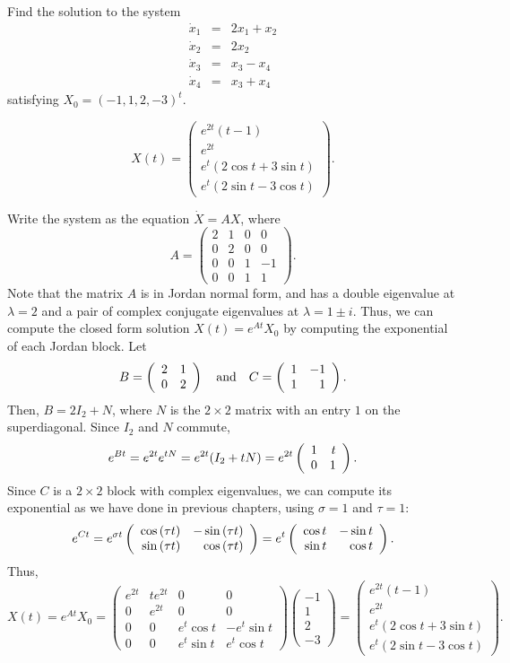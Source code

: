 \documentclass{ximera}
\begin{document}
\begin{exercise} \label{c11.1.1}
Find the solution to the system
\begin{eqnarray*}
\dot{x}_1 & = & 2x_1+x_2 \\
\dot{x}_2 & = & 2x_2 \\
\dot{x}_3 & = & x_3-x_4 \\
\dot{x}_4 & = & x_3+x_4
\end{eqnarray*}
satisfying $X_0=(-1,1,2,-3)^t$.

\begin{solution}
\ans 
\[
X(t) =
\left(\begin{array}{c}
e^{2t}(t - 1) \\
e^{2t} \\
e^t(2\cos{t} + 3\sin{t}) \\
e^t(2\sin{t} - 3\cos{t})
\end{array}\right).
\]

\soln Write the system as the equation $\dot{X} = AX$, where
\[
A =
\left(\begin{array}{rrrr}
2 & 1 & 0 & 0 \\
0 & 2 & 0 & 0 \\
0 & 0 & 1 & -1 \\
0 & 0 & 1 & 1
\end{array}\right).
\]
Note that the matrix $A$ is in Jordan normal form, and has a double
eigenvalue at $\lambda = 2$ and a pair of complex conjugate eigenvalues
at $\lambda = 1 \pm i$.  Thus, we can compute the closed form solution
$X(t) = e^{At}X_0$ by computing the exponential of each Jordan block.  Let
\[
B = \left(\begin{array}{rr} 2 & 1\\ 0 &2\end{array}\right) \quad\mbox{and}\quad C = \left(\begin{array}{rr} 1 & -1\\ 1 &1\end{array}\right).
\]
Then, $B = 2I_2 + N$, where $N$ is the $2 \times 2$ matrix with an entry $1$
on the superdiagonal.  Since $I_2$ and $N$ commute,
\[
e^{Bt} = e^{2t}e^{tN} = e^{2t}(I_2 + tN) =
e^{2t}\left(\begin{array}{rr} 1 & t\\ 0 &1\end{array}\right).
\]
Since $C$ is a $2 \times 2$ block with complex eigenvalues, we can
compute its exponential as we have done in previous chapters, using
$\sigma = 1$ and $\tau = 1$:
\[
e^{Ct} = e^{\sigma t}\left(\begin{array}{rr} \cos{(\tau t)} & -\sin{(\tau t)}\\ \sin{(\tau t)} &\cos{(\tau t)}\end{array}\right)
= e^{t}\left(\begin{array}{rr} \cos{t} & -\sin{t}\\ \sin{t} &\cos{t}\end{array}\right).
\]
Thus,
\[
X(t) = e^{At}X_0 =
\left(\begin{array}{cccc}
e^{2t} & te^{2t} & 0 & 0 \\
0 & e^{2t} & 0 & 0 \\
0 & 0 & e^t\cos{t} & -e^t\sin{t} \\
0 & 0 & e^t\sin{t} & e^t\cos{t}
\end{array}\right)
\left(\begin{array}{r} -1 \\ 1 \\ 2 \\ -3 \end{array}\right)
= \left(\begin{array}{c}
e^{2t}(t - 1) \\
e^{2t} \\
e^t(2\cos{t} + 3\sin{t}) \\
e^t(2\sin{t} - 3\cos{t})
\end{array}\right).
\]

\end{solution}
\end{exercise}
\end{document}
